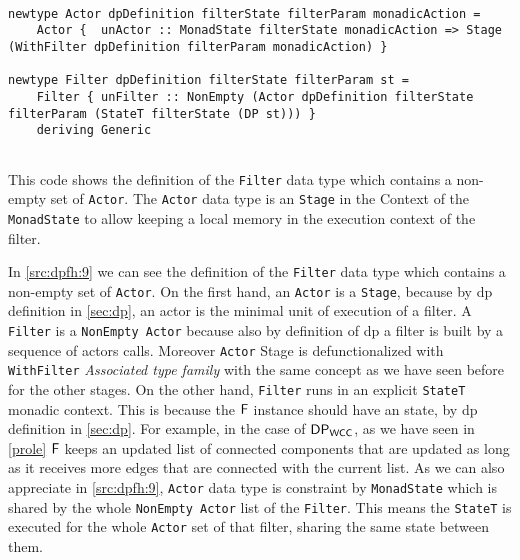\begin{listing}[htp!]
  \begin{verbatim}

newtype Actor dpDefinition filterState filterParam monadicAction =
    Actor {  unActor :: MonadState filterState monadicAction => Stage (WithFilter dpDefinition filterParam monadicAction) }

newtype Filter dpDefinition filterState filterParam st =
    Filter { unFilter :: NonEmpty (Actor dpDefinition filterState filterParam (StateT filterState (DP st))) }
    deriving Generic
    
  \end{verbatim}
  \caption[{[\texttt{Stage.hs}] Filter / Actor Data Type}]{This code shows the definition of the \texttt{Filter} data type which contains a non-empty set of \texttt{Actor}. The \texttt{Actor} data type is an \texttt{Stage} in the Context of the \texttt{MonadState} to allow keeping a local memory in the execution context of the filter.}
  \label{src:dpfh:9}
\end{listing}

In \autoref{src:dpfh:9} we can see the definition of the \texttt{Filter} data type which contains a non-empty set of \texttt{Actor}.
On the first hand, an \texttt{Actor} is a \texttt{Stage}, because by \acrshort{dp} definition in \autoref{sec:dp}, an actor is the minimal unit of execution of a filter. A \texttt{Filter} is a \texttt{NonEmpty Actor} because also by definition of \acrshort{dp} a filter is built by a sequence of actors calls. 
Moreover \texttt{Actor} Stage is defunctionalized with \texttt{WithFilter} \emph{Associated type family} with the same concept as we have seen before for the other stages. 
On the other hand, \texttt{Filter} runs in an explicit \texttt{StateT} monadic context. This is because the $\mathsf{F}$ instance should have an state, by \acrshort{dp} definition in \autoref{sec:dp}.
For example, in the case of $\mathsf{DP_{WCC}}$, as we have seen in \autoref{prole} $\mathsf{F}$ keeps an updated list of connected components that are updated as long as it receives more edges that are connected with the current list.
As we can also appreciate in \autoref{src:dpfh:9}, \texttt{Actor} data type is constraint by \texttt{MonadState} which is shared by the whole \texttt{NonEmpty Actor} list of the \texttt{Filter}. This means the \texttt{StateT} is executed for the whole \texttt{Actor} set of that filter, sharing the same state between them. 

